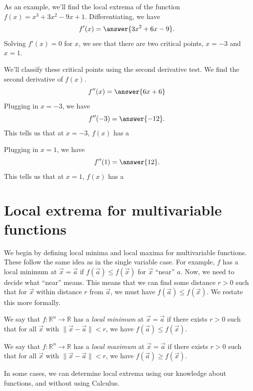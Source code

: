\documentclass{ximera}
\begin{document}
\begin{example}
As an example, we'll find the local extrema of the function $f(x) = x^3+3x^2-9x+1$. Differentiating, we have
\[
f'(x) = \answer{3x^2+6x-9}.
\]
Solving $f'(x)=0$ for $x$, we see that there are two critical points, $x=-3$ and $x=1$.

We'll classify these critical points using the second derivative test. We find the second derivative of $f(x)$.
\[
f''(x) = \answer{6x+6}
\]
Plugging in $x=-3$, we have
\[
f''(-3) = \answer{-12}.
\]
This tells us that at $x=-3$, $f(x)$ has a
\begin{multipleChoice}
\end{multipleChoice}
Plugging in $x=1$, we have
\[
f''(1) = \answer{12}.
\]
This tells us that at $x=1$, $f(x)$ has a
\begin{multipleChoice}
\end{multipleChoice}
\end{example}

\section*{Local extrema for multivariable functions}

We begin by defining local minima and local maxima for multivariable functions. These follow the same idea as in the single variable case. For example, $f$ has a local minimum at $\vec{x}=\vec{a}$ if $f(\vec{a})\leq f(\vec{x})$ for $\vec{x}$ ``near'' $a$. Now, we need to decide what ``near'' means. This means that we can find some distance $r>0$ such that for $\vec{x}$ within distance $r$ from $\vec{a}$, we must have $f(\vec{a})\leq f(\vec{x})$. We restate this more formally.

\begin{definition}
We say that $f:\mathbb{R}^n\rightarrow\mathbb{R}$ has a \emph{local minimum} at $\vec{x}=\vec{a}$ if there exists $r>0$ such that for all $\vec{x}$ with $\|\vec{x}-\vec{a}\|<r$, we have $f(\vec{a})\leq f(\vec{x})$.

We say that $f:\mathbb{R}^n\rightarrow\mathbb{R}$ has a \emph{local maximum} at $\vec{x}=\vec{a}$ if there exists $r>0$ such that for all $\vec{x}$ with $\|\vec{x}-\vec{a}\|<r$, we have $f(\vec{a})\geq f(\vec{x})$.
\end{definition}

In some cases, we can determine local extrema using our knowledge about functions, and without using Calculus.
\end{document}
